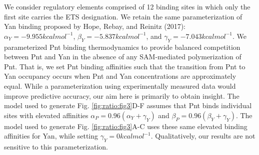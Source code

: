 We consider regulatory elements comprised of 12 binding sites in which only the first site carries the ETS designation. We retain the same parameterization of Yan binding proposed by Hope, Rebay, and Reinitz (2017): $\alpha_Y = -9.955 kcal mol^{-1}$, $\beta_Y = -5.837 kcal mol^{-1}$, and $\gamma_Y = -7.043 kcal mol^{-1}$. We parameterized Pnt binding thermodynamics to provide balanced competition between Pnt and Yan in the absence of any SAM-mediated polymerization of Pnt. That is, we set Pnt binding affinities such that the transition from Pnt to Yan occupancy occurs when Pnt and Yan concentrations are approximately equal. While a parameterization using experimentally measured data would improve predictive accuracy, our aim here is primarily to obtain insight. The model used to generate Fig. \ref{fig:ratio:fig3}D-F assumes that Pnt binds individual sites with elevated affinities $\alpha_P = 0.96 (\alpha_Y + \gamma_Y )$ and $\beta_P = 0.96 (\beta_Y + \gamma_Y )$. The model used to generate Fig. \ref{fig:ratio:fig3}A-C uses these same elevated binding affinities for Yan, while setting $\gamma_Y = 0 kcal mol^{-1}$. Qualitatively, our results are not sensitive to this parameterization. 
